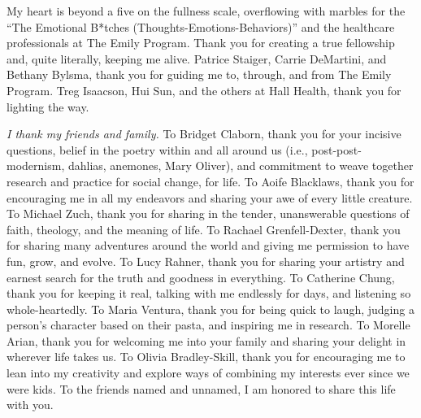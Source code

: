 My heart is beyond a five on the fullness scale, overflowing with marbles for the
``The Emotional B*tches (Thoughts-Emotions-Behaviors)'' and the healthcare
professionals at The Emily Program. 
Thank you for creating a true fellowship and, quite literally, keeping me alive.
Patrice Staiger, Carrie DeMartini, and Bethany Bylsma, thank you for guiding me
to, through, and from The Emily Program. Treg Isaacson, Hui Sun, and the others 
at Hall Health, thank you for lighting the way.

\textit{I thank my friends and family.} To Bridget Claborn, thank you for your
incisive questions, belief in the poetry within and all around us (i.e.,
post-post-modernism, dahlias, anemones, Mary Oliver), and commitment to weave
together research and practice for social change, for life.
To Aoife Blacklaws, thank you for encouraging me in all my endeavors and sharing
your awe of every little creature. To Michael Zuch, thank you for sharing in the
tender, unanswerable questions of faith, theology, and the meaning of life. To Rachael
Grenfell-Dexter, thank you for sharing many adventures around the world and giving me permission to have fun, grow, and evolve. 
To Lucy Rahner, thank you for sharing your artistry and earnest search for the truth and
goodness in everything. To Catherine Chung, thank you for keeping it real,
talking with me endlessly for days, and listening so whole-heartedly. 
To Maria Ventura, thank you for being quick to laugh, judging a person's character based on their pasta, and inspiring me in research.
To Morelle Arian, thank you for welcoming me into your family and sharing your delight in wherever life takes us. 
To Olivia Bradley-Skill, thank you for encouraging me to lean into my creativity and explore ways of combining my interests ever since we were kids.
To the friends named and unnamed, I am honored to share this life with you. 

